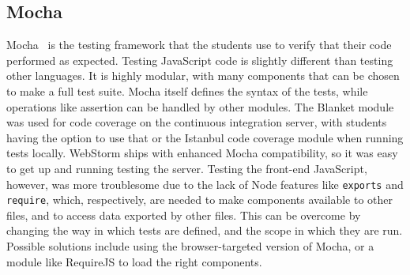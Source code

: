\documentclass[12pt]{article}
\newcommand{\code}[1]{{\texttt {#1}}}
\begin{document}
\subsection{Mocha}\label{sec:mocha}
Mocha~\cite{Mocha} is the testing framework that the students use to verify that their code performed as expected. 
Testing JavaScript code is slightly different than testing other languages. 
It is highly modular, with many components that can be chosen to make a full test suite. 
Mocha itself defines the syntax of the tests, while operations like assertion can be handled by other modules. 
The Blanket module was used for code coverage on the continuous integration server, with students having the option to use that or the Istanbul code coverage module when running tests locally. 
WebStorm ships with enhanced Mocha compatibility, so it was easy to get up and running testing the server. 
Testing the front-end JavaScript, however, was more troublesome due to the lack of Node features like \code{exports} and \code{require}, which, respectively, are needed to make components available to other files, and to access data exported by other files. 
This can be overcome by changing the way in which tests are defined, and the scope in which they are run. 
Possible solutions include using the browser-targeted version of Mocha, or a module like RequireJS to load the right components.
\end{document}
